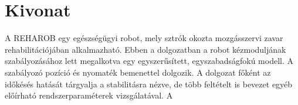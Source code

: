 \cleardoublepage{}
\chapter*{Kivonat}

A REHAROB egy egészségügyi robot, mely sztrók okozta mozgásszervi 
zavar rehabilitációjában alkalmazható. Ebben a dolgozatban a robot 
kézmoduljának szabályozásához lett megalkotva egy egyszerűsített, 
egyszabadságfokú modell. A szabályozó pozíció és nyomaték bemenettel 
dolgozik. A dolgozat főként az időkésés hatását tárgyalja a stabilitásra nézve, 
de több feltételt is bevezet egyéb előírható rendszerparaméterek vizsgálatával.
A 